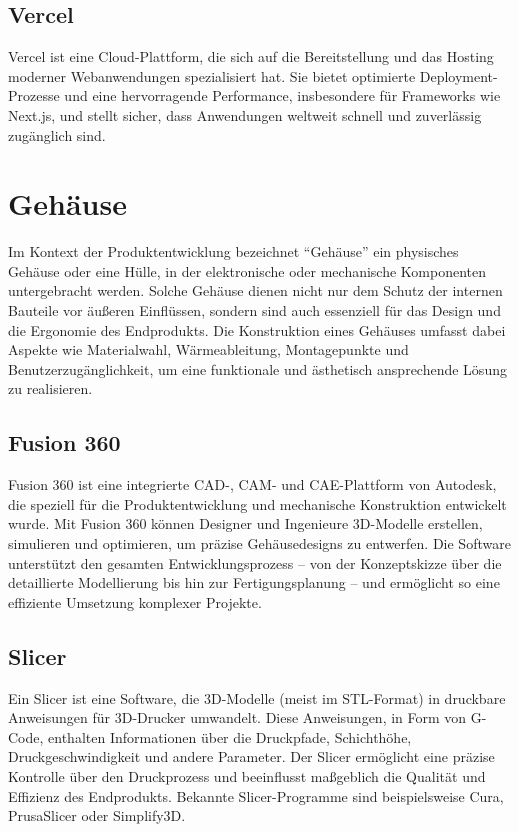 \begin{inhalt}
\subsection{Vercel}
Vercel \cite{VercelWiki} ist eine Cloud-Plattform, die sich auf die Bereitstellung und das Hosting moderner Webanwendungen spezialisiert hat. Sie bietet optimierte Deployment-Prozesse und eine hervorragende Performance, insbesondere für Frameworks wie Next.js, und stellt sicher, dass Anwendungen weltweit schnell und zuverlässig zugänglich sind.

\section{Gehäuse}  
Im Kontext der Produktentwicklung bezeichnet ``Gehäuse'' ein physisches Gehäuse oder eine Hülle, in der elektronische oder mechanische Komponenten untergebracht werden. Solche Gehäuse dienen nicht nur dem Schutz der internen Bauteile vor äußeren Einflüssen, sondern sind auch essenziell für das Design und die Ergonomie des Endprodukts. Die Konstruktion eines Gehäuses umfasst dabei Aspekte wie Materialwahl, Wärmeableitung, Montagepunkte und Benutzerzugänglichkeit, um eine funktionale und ästhetisch ansprechende Lösung zu realisieren.

\subsection{Fusion 360}
\label{ref:fusion360_grundlagen}
Fusion 360 \cite{Fusion360} ist eine integrierte CAD-, CAM- und CAE-Plattform von Autodesk, die speziell für die Produktentwicklung und mechanische Konstruktion entwickelt wurde. Mit Fusion 360 können Designer und Ingenieure 3D-Modelle erstellen, simulieren und optimieren, um präzise Gehäusedesigns zu entwerfen. Die Software unterstützt den gesamten Entwicklungsprozess – von der Konzeptskizze über die detaillierte Modellierung bis hin zur Fertigungsplanung – und ermöglicht so eine effiziente Umsetzung komplexer Projekte.

\subsection{Slicer}

Ein Slicer \cite{Slicer} ist eine Software, die 3D-Modelle (meist im STL-Format) in druckbare Anweisungen für 3D-Drucker umwandelt. Diese Anweisungen, in Form von G-Code, enthalten Informationen über die Druckpfade, Schichthöhe, Druckgeschwindigkeit und andere Parameter. Der Slicer ermöglicht eine präzise Kontrolle über den Druckprozess und beeinflusst maßgeblich die Qualität und Effizienz des Endprodukts. Bekannte Slicer-Programme sind beispielsweise Cura, PrusaSlicer oder Simplify3D.


\end{inhalt}